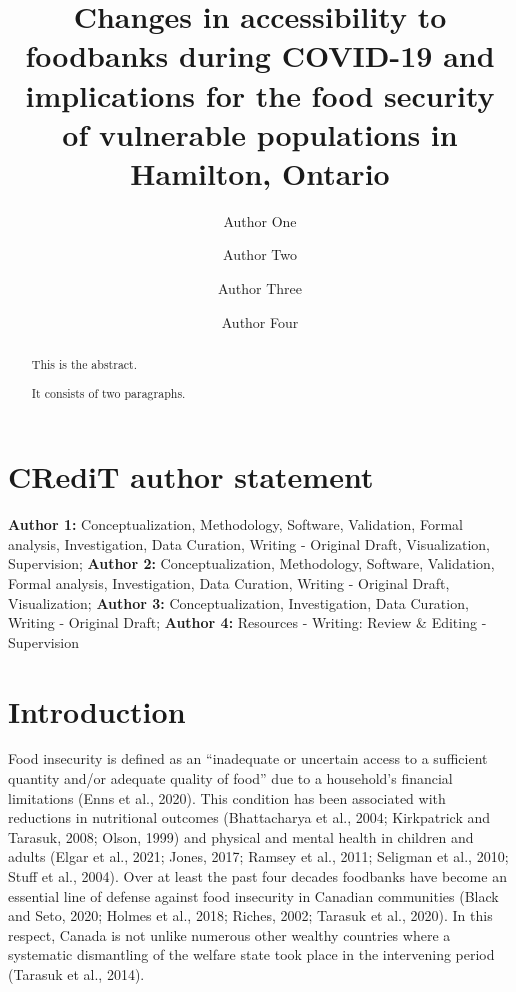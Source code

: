 \documentclass[]{elsarticle} %
\begin{document}
\begin{frontmatter}

  \title{Changes in accessibility to foodbanks during COVID-19 and
implications for the food security of vulnerable populations in
Hamilton, Ontario}
    \author[Some University]{Author One}
    \author[]{Author Two}
    \author[Some University]{Author Three}
    \author[Another University]{Author Four}
      \address[Some University]{Department, Street, City, State, Zip}
    \address[Another University]{Department, Street, City, State, Zip}
  
  \begin{abstract}
  This is the abstract.

  It consists of two paragraphs.
  \end{abstract}
  
 \end{frontmatter}

\hypertarget{credit-author-statement}{%
\section{CRediT author statement}\label{credit-author-statement}}

\textbf{Author 1:} Conceptualization, Methodology, Software, Validation,
Formal analysis, Investigation, Data Curation, Writing - Original Draft,
Visualization, Supervision; \textbf{Author 2:} Conceptualization,
Methodology, Software, Validation, Formal analysis, Investigation, Data
Curation, Writing - Original Draft, Visualization; \textbf{Author 3:}
Conceptualization, Investigation, Data Curation, Writing - Original
Draft; \textbf{Author 4:} Resources - Writing: Review \& Editing -
Supervision

\newpage

\hypertarget{introduction}{%
\section{Introduction}\label{introduction}}

Food insecurity is defined as an ``inadequate or uncertain access to a
sufficient quantity and/or adequate quality of food'' due to a
household's financial limitations (Enns et al., 2020). This condition
has been associated with reductions in nutritional outcomes
(Bhattacharya et al., 2004; Kirkpatrick and Tarasuk, 2008; Olson, 1999)
and physical and mental health in children and adults (Elgar et al.,
2021; Jones, 2017; Ramsey et al., 2011; Seligman et al., 2010; Stuff et
al., 2004). Over at least the past four decades foodbanks have become an
essential line of defense against food insecurity in Canadian
communities (Black and Seto, 2020; Holmes et al., 2018; Riches, 2002;
Tarasuk et al., 2020). In this respect, Canada is not unlike numerous
other wealthy countries where a systematic dismantling of the welfare
state took place in the intervening period (Tarasuk et al., 2014).
\end{document}
